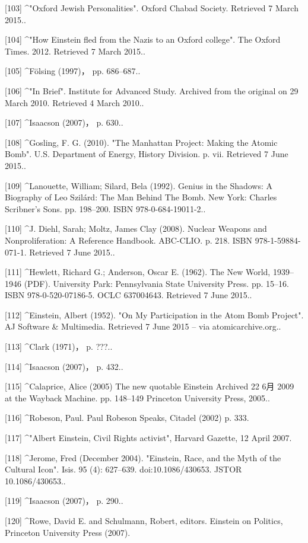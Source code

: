 [103]
^"Oxford Jewish Personalities". Oxford Chabad Society. Retrieved 7 March 2015..

[104]
^"How Einstein fled from the Nazis to an Oxford college". The Oxford Times. 2012. Retrieved 7 March 2015..

[105]
^Fölsing (1997)， pp. 686–687..

[106]
^"In Brief". Institute for Advanced Study. Archived from the original on 29 March 2010. Retrieved 4 March 2010..

[107]
^Isaacson (2007)， p. 630..

[108]
^Gosling, F. G. (2010). "The Manhattan Project: Making the Atomic Bomb". U.S. Department of Energy, History Division. p. vii. Retrieved 7 June 2015..

[109]
^Lanouette, William; Silard, Bela (1992). Genius in the Shadows: A Biography of Leo Szilárd: The Man Behind The Bomb. New York: Charles Scribner's Sons. pp. 198–200. ISBN 978-0-684-19011-2..

[110]
^J. Diehl, Sarah; Moltz, James Clay (2008). Nuclear Weapons and Nonproliferation: A Reference Handbook. ABC-CLIO. p. 218. ISBN 978-1-59884-071-1. Retrieved 7 June 2015..

[111]
^Hewlett, Richard G.; Anderson, Oscar E. (1962). The New World, 1939–1946 (PDF). University Park: Pennsylvania State University Press. pp. 15–16. ISBN 978-0-520-07186-5. OCLC 637004643. Retrieved 7 June 2015..

[112]
^Einstein, Albert (1952). "On My Participation in the Atom Bomb Project". AJ Software & Multimedia. Retrieved 7 June 2015 – via atomicarchive.org..

[113]
^Clark (1971)， p. ???..

[114]
^Isaacson (2007)， p. 432..

[115]
^Calaprice, Alice (2005) The new quotable Einstein Archived 22 6月 2009 at the Wayback Machine. pp. 148–149 Princeton University Press, 2005..

[116]
^Robeson, Paul. Paul Robeson Speaks, Citadel (2002) p. 333.

[117]
^"Albert Einstein, Civil Rights activist", Harvard Gazette, 12 April 2007.

[118]
^Jerome, Fred (December 2004). "Einstein, Race, and the Myth of the Cultural Icon". Isis. 95 (4): 627–639. doi:10.1086/430653. JSTOR 10.1086/430653..

[119]
^Isaacson (2007)， p. 290..

[120]
^Rowe, David E. and Schulmann, Robert, editors. Einstein on Politics, Princeton University Press (2007).

